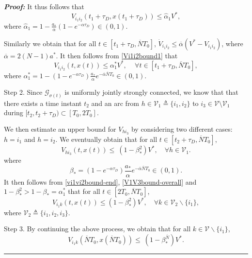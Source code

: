 \documentclass[a4paper, 11pt]{article}
\def \defn{\triangleq}
\newenvironment{IEEEproof}[1][\bf Proof]{\smallskip\par\noindent\textit{#1: }}{\hspace*{\fill} \rule{6pt}{6pt}\smallskip}
\begin{document}
\begin{IEEEproof}
It thus follows that
\begin{equation}\label{Vi1i2bound1}
V_{i_1i_2}(t_1+\tau_D,x(t_1+\tau_D))\leq \hat{\alpha}_1V^*,
\end{equation}
where $\hat{\alpha}_1=1-\frac{a_*}{\alpha}(1-e^{-\alpha \tau_D}) \in (0,1)$.

Similarly we obtain that for all $t\in[t_1+\tau_D,\overline{N}T_0]$, $\dot V_{i_1i_2} \leq \overline{\alpha}(V^*-V_{i_1i_2})$, where $\overline{\alpha}=2(N-1)a^*$. It then follows from \eqref{Vi1i2bound1} that
\begin{equation}\label{vi1vi2bound-end}
V_{i_1i_2}(t,x(t)) \leq \alpha_1^*V^*, \quad \, \forall t\in[t_1+\tau_D,\overline{N}T_0],
\end{equation}
where $\alpha_1^*=1-(1-e^{-\alpha \tau_D})\frac{a_*}{\alpha}e^{-\overline{\alpha}\overline{N}T_0} \in (0,1)$.

\vspace*{2mm}

\noindent Step 2.   Since $\mathcal{G}_{\sigma(t)}$ is uniformly jointly strongly connected, we know that
that there exists a time instant $t_2$ and an arc from $h\in \mathcal{V}_1 \defn \{i_1,i_2\}$ to
$i_3\in\mathcal{V}\setminus \mathcal{V}_1$ during $[t_2,t_2+\tau_D)\subset[T_0,2T_0]$.

We then estimate an upper bound for $V_{hi_3}$ by considering two different cases: $h=i_1$ and $h=i_2$.
We eventually obtain that for all $t\in[t_2+\tau_D,\overline{N}T_0]$,
\begin{equation}\label{V1V3bound-overall}
V_{h i_3}(t,x(t))\leq ~(1-\beta_*^2)V^*, \quad \forall h \in \mathcal{V}_1.
\end{equation}
where
\begin{equation}\label{beta-star}
\beta_*=(1-e^{-\alpha \tau_D})\frac{a_*}{\alpha}e^{-\overline{\alpha}\overline{N}T_0} \in (0,1).
\end{equation}
It then follows from \eqref{vi1vi2bound-end}, \eqref{V1V3bound-overall}
and $1-\beta_*^2>1-\beta_*=\alpha_1^*$ that for all $t\in[2T_0,\overline{N}T_0]$,
\begin{equation*}
V_{i_1k}(t, x(t)) \leq (1-\beta_*^2)V^*, \quad \forall k\in \mathcal{V}_2\backslash \{i_1\},
\end{equation*}
where $\mathcal{V}_2 \defn \{i_1,i_2,i_3\}$.

\vspace*{2mm}

\noindent Step 3. By continuing the above process, we obtain that for all $k\in \mathcal{V}\backslash \{i_1\}$,
\begin{equation}\label{eq:bound1}
V_{i_1k}(\overline{N}T_0, x(\overline{N}T_0))\leq ~(1-\beta_*^{\overline{N}})V^*.
\end{equation}


\end{IEEEproof}
\end{document}
